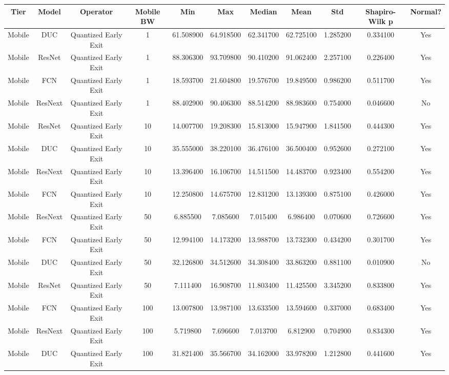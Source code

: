 \begin{tabular}{|c||c||c||c||c||c||c||c||c||c||c|}
\toprule
Tier & Model & Operator & Mobile BW & Min & Max & Median & Mean & Std & Shapiro-Wilk p & Normal? \\
\midrule
Mobile & DUC & Quantized Early Exit & 1 & 61.508900 & 64.918500 & 62.341700 & 62.725100 & 1.285200 & 0.334100 & Yes \\
Mobile & ResNet & Quantized Early Exit & 1 & 88.306300 & 93.709800 & 90.410200 & 91.062400 & 2.257100 & 0.226400 & Yes \\
Mobile & FCN & Quantized Early Exit & 1 & 18.593700 & 21.604800 & 19.576700 & 19.849500 & 0.986200 & 0.511700 & Yes \\
Mobile & ResNext & Quantized Early Exit & 1 & 88.402900 & 90.406300 & 88.514200 & 88.983600 & 0.754000 & 0.046600 & No \\
Mobile & ResNet & Quantized Early Exit & 10 & 14.007700 & 19.208300 & 15.813000 & 15.947900 & 1.841500 & 0.444300 & Yes \\
Mobile & DUC & Quantized Early Exit & 10 & 35.555000 & 38.220100 & 36.476100 & 36.500400 & 0.952600 & 0.272100 & Yes \\
Mobile & ResNext & Quantized Early Exit & 10 & 13.396400 & 16.106700 & 14.511500 & 14.483700 & 0.923400 & 0.554200 & Yes \\
Mobile & FCN & Quantized Early Exit & 10 & 12.250800 & 14.675700 & 12.831200 & 13.139300 & 0.875100 & 0.426000 & Yes \\
Mobile & ResNext & Quantized Early Exit & 50 & 6.885500 & 7.085600 & 7.015400 & 6.986400 & 0.070600 & 0.726600 & Yes \\
Mobile & FCN & Quantized Early Exit & 50 & 12.994100 & 14.173200 & 13.988700 & 13.732300 & 0.434200 & 0.301700 & Yes \\
Mobile & DUC & Quantized Early Exit & 50 & 32.126800 & 34.512600 & 34.308400 & 33.863200 & 0.881100 & 0.010900 & No \\
Mobile & ResNet & Quantized Early Exit & 50 & 7.111400 & 16.908700 & 11.803400 & 11.425500 & 3.345200 & 0.833800 & Yes \\
Mobile & FCN & Quantized Early Exit & 100 & 13.007800 & 13.987100 & 13.633500 & 13.594600 & 0.337000 & 0.683400 & Yes \\
Mobile & ResNext & Quantized Early Exit & 100 & 5.719800 & 7.696600 & 7.013700 & 6.812900 & 0.704900 & 0.834300 & Yes \\
Mobile & DUC & Quantized Early Exit & 100 & 31.821400 & 35.566700 & 34.162000 & 33.978200 & 1.212800 & 0.441600 & Yes \\

\end{tabular}
